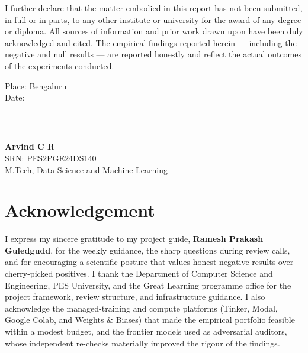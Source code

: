 \documentclass[12pt,a4paper]{report}
\begin{document}
\vspace{0.6em}

I further declare that the matter embodied in this report has not been submitted,
in full or in parts, to any other institute or university for the award of any
degree or diploma. All sources of information and prior work drawn upon have been
duly acknowledged and cited. The empirical findings reported herein --- including
the negative and null results --- are reported honestly and reflect the actual
outcomes of the experiments conducted.

\vspace{3.2em}

\noindent
\begin{minipage}[t]{0.5\linewidth}
Place: Bengaluru\\[0.4em]
Date: \rule{3cm}{0.4pt}
\end{minipage}
\hfill
\begin{minipage}[t]{0.45\linewidth}
\centering
\vspace{1.2em}
\rule{5cm}{0.4pt}\\
\textbf{Arvind C R}\\
SRN: PES2PGE24DS140\\
M.Tech, Data Science and Machine Learning
\end{minipage}

\clearpage
\hypersetup{pageanchor=true}
\setcounter{page}{1}

\chapter*{Acknowledgement}
I express my sincere gratitude to my project guide, \textbf{Ramesh Prakash
Guledgudd}, for the weekly guidance, the sharp questions during review calls, and
for encouraging a scientific posture that values honest negative results over
cherry-picked positives. I thank the Department of Computer Science and
Engineering, PES University, and the Great Learning programme office for the
project framework, review structure, and infrastructure guidance. I also
acknowledge the managed-training and compute platforms (Tinker, Modal, Google
Colab, and Weights \& Biases) that made the empirical portfolio feasible within a
modest budget, and the frontier models used as adversarial auditors, whose
independent re-checks materially improved the rigour of the findings.
\end{document}
